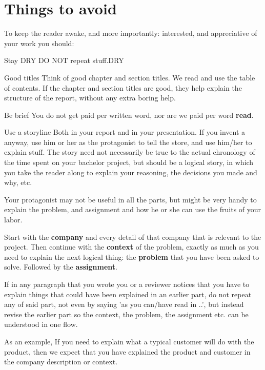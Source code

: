 \section{Things to avoid}
To keep the reader awake, and more importantly: interested, and appreciative of your work you should:
\begin{Description}
\item[Stay DRY] DO NOT repeat stuff.\gls{DRY}
\item[Good titles] Think of good chapter and section titles. We read
  and use the table of contents. If the chapter and section titles are
  good, they help explain the structure of the report, without any
  extra boring help.
\item[Be brief] You do not get paid per written word, nor are we paid per word \textbf{read}.
\item[Use a storyline] Both in your report and in your
  presentation. If you invent a  anyway, use him or her as the
  protagonist to tell the store, and use him/her to explain stuff. 
The story need not necessarily be true to the actual chronology of the
time spent on your bachelor project, but should be a logical story, in
which you take the reader along to explain your reasoning, the
decisions you made and why, etc. 
\end{Description}

Your protagonist may not be useful in all the parts, but might be very
handy to explain the problem, and assignment and how he or she can use the
fruits of your labor.

Start with the \textbf{company} and every detail of that company that is relevant to the project.
Then continue with the \textbf{context} of the problem, exactly as
much as you need to explain the next logical thing: the
\textbf{problem} that you have been asked to solve. Followed by the
\textbf{assignment}.

If in any paragraph that you wrote you or a reviewer notices that you
have to explain things that could have been explained in an earlier
part, do not repeat any of said part, not even by saying 'as you
can/have read in ..', but instead revise the earlier part so the
context, the problem, the assignment etc. can be understood in one
flow.

As an example, If you need to explain what a typical customer will do
with the product, then we expect that you have explained the product and
customer in the company description or context.

